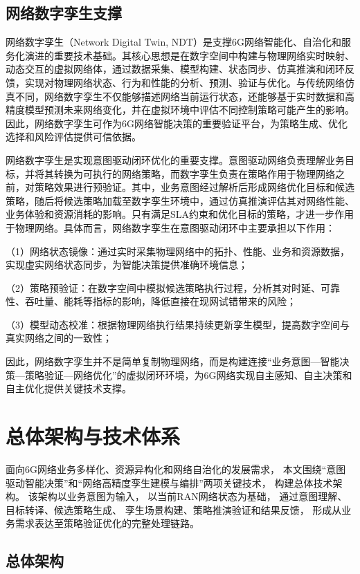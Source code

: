 \documentclass[lang=cn,12pt]{elegantbook}
\begin{document}
\section{网络数字孪生支撑}

网络数字孪生（Network Digital Twin, NDT）是支撑6G网络智能化、自治化和服务化演进的重要技术基础。其核心思想是在数字空间中构建与物理网络实时映射、动态交互的虚拟网络体，通过数据采集、模型构建、状态同步、仿真推演和闭环反馈，实现对物理网络状态、行为和性能的分析、预测、验证与优化。与传统网络仿真不同，网络数字孪生不仅能够描述网络当前运行状态，还能够基于实时数据和高精度模型预测未来网络变化，并在虚拟环境中评估不同控制策略可能产生的影响。因此，网络数字孪生可作为6G网络智能决策的重要验证平台，为策略生成、优化选择和风险评估提供可信依据。


网络数字孪生是实现意图驱动闭环优化的重要支撑。意图驱动网络负责理解业务目标，并将其转换为可执行的网络策略，而数字孪生负责在策略作用于物理网络之前，对策略效果进行预验证。其中，业务意图经过解析后形成网络优化目标和候选策略，随后将候选策略加载至数字孪生环境中，通过仿真推演评估其对网络性能、业务体验和资源消耗的影响。只有满足SLA约束和优化目标的策略，才进一步作用于物理网络。具体而言，网络数字孪生在意图驱动闭环中主要承担以下作用：

（1）网络状态镜像：通过实时采集物理网络中的拓扑、性能、业务和资源数据，实现虚实网络状态同步，为智能决策提供准确环境信息；

（2）策略预验证：在数字空间中模拟候选策略执行过程，分析其对时延、可靠性、吞吐量、能耗等指标的影响，降低直接在现网试错带来的风险；

（3）模型动态校准：根据物理网络执行结果持续更新孪生模型，提高数字空间与真实网络之间的一致性；

因此，网络数字孪生并不是简单复制物理网络，而是构建连接“业务意图—智能决策—策略验证—网络优化”的虚拟闭环环境，为6G网络实现自主感知、自主决策和自主优化提供关键技术支撑。

\chapter{总体架构与技术体系}
\label{chap:overall_architecture}

面向6G网络业务多样化、资源异构化和网络自治化的发展需求，
本文围绕“意图驱动智能决策”和“网络高精度孪生建模与编排”两项关键技术，
构建总体技术架构。
该架构以业务意图为输入，
以当前RAN网络状态为基础，
通过意图理解、目标转译、候选策略生成、
孪生场景构建、策略推演验证和结果反馈，
形成从业务需求表达至策略验证优化的完整处理链路。

\section{总体架构}
\end{document}
